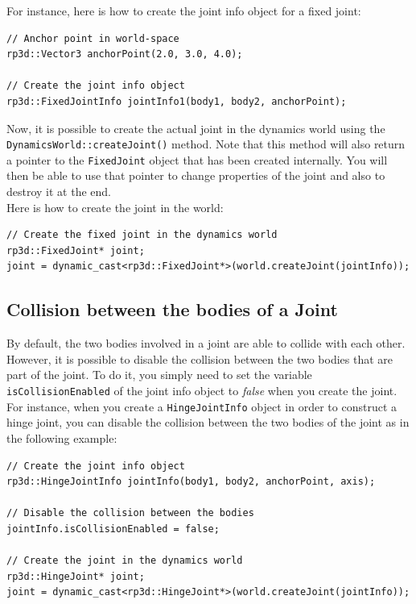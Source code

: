 \documentclass[a4paper,12pt]{article}
\begin{document}
    For instance, here is how to create the joint info object for a fixed joint: \\

    \begin{lstlisting}
// Anchor point in world-space
rp3d::Vector3 anchorPoint(2.0, 3.0, 4.0);

// Create the joint info object
rp3d::FixedJointInfo jointInfo1(body1, body2, anchorPoint);
  \end{lstlisting}

    \vspace{0.6cm}

    Now, it is possible to create the actual joint in the dynamics world using the \texttt{DynamicsWorld::createJoint()} method.
    Note that this method will also return a pointer to the \texttt{FixedJoint} object that has been created internally. You will then
    be able to use that pointer to change properties of the joint and also to destroy it at the end. \\

    Here is how to create the joint in the world: \\

    \begin{lstlisting}
// Create the fixed joint in the dynamics world
rp3d::FixedJoint* joint;
joint = dynamic_cast<rp3d::FixedJoint*>(world.createJoint(jointInfo));
  \end{lstlisting}

    \subsection{Collision between the bodies of a Joint}

    By default, the two bodies involved in a joint are able to collide with each other. However, it is possible to disable the collision between the two bodies that are part
    of the joint. To do it, you simply need to set the variable \texttt{isCollisionEnabled} of the joint info object to \emph{false} when you create the joint. \\

    For instance, when you create a \texttt{HingeJointInfo} object in order to construct a hinge joint, you can disable the collision between the two bodies of the joint as in the
    following example: \\

    \begin{lstlisting}
// Create the joint info object
rp3d::HingeJointInfo jointInfo(body1, body2, anchorPoint, axis);

// Disable the collision between the bodies
jointInfo.isCollisionEnabled = false;

// Create the joint in the dynamics world
rp3d::HingeJoint* joint;
joint = dynamic_cast<rp3d::HingeJoint*>(world.createJoint(jointInfo));
  \end{lstlisting}
\end{document}
